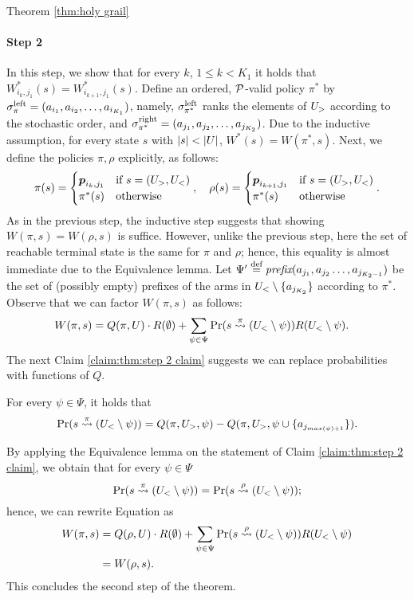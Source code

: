 \begin{proofof}{Theorem \ref{thm:holy grail}}
\paragraph{Step 2}  In this step, we show that for every $k$, $1\leq k < K_1$ it holds that $W^*_{{i_k},{j_1}}(s) = W^*_{{i_{k+1}},{j_1}}(s)$. Define an ordered, $\mathcal{P}$-valid policy $\pi^*$ by $\sigma^{\textnormal{left}}_\pi = (a_{i_1},a_{i_2},\dots,a_{i_{K_1}})$,  namely, $\sigma^{\textnormal{left}}_{\pi^*}$ ranks the elements of $U_>$ according to the stochastic order, and $\sigma^{\textnormal{right}}_{\pi^*}=(a_{j_1},a_{j_2},\dots,a_{j_{K_2}})$. Due to the inductive assumption, for every state $s$ with $\left| s \right|<\left| U \right|$, $W^*(s) = W(\pi^*,s)$. Next, we define the policies $\pi,\rho$ explicitly, as follows:
\[
\pi(s) = 
\begin{cases}
\boldsymbol{ p }_{{i_k},{j_1}} & \textnormal{if $s=(U_>,U_<)$} \\
\pi^*(s)& \textnormal{otherwise} 
\end{cases},\quad 
\rho(s) = 
\begin{cases}
\boldsymbol{ p }_{{i_{k+1}},{j_{1}}} & \textnormal{if $s=(U_>,U_<)$} \\
\pi^*(s)& \textnormal{otherwise}
\end{cases}.
\]
As in the previous step, the inductive step suggests that showing $W(\pi,s)=W(\rho,s)$ is suffice. However, unlike the previous step, here the set of reachable terminal state is the same for $\pi$ and $\rho$; hence, this equality is almost immediate due to the Equivalence lemma. Let $\Psi'\stackrel{\text{def}}{=} \textit{prefix}(a_{j_1},a_{j_2}\dots, a_{j_{K_2-1}})$ be the set of (possibly empty) prefixes of the arms in $U_< \setminus \{a_{j_{K_2}}\}$ according to $\pi^*$. Observe that we can factor $W(\pi,s)$ as follows:
\begin{align}\label{eq:w for pi with prob}
W(\pi,s) &= Q(\pi,U)\cdot R(\emptyset)+ \sum_{\psi \in \Psi}\Pr(s\stackrel{\pi}{\rightsquigarrow}(U_< \setminus \psi))R(U_< \setminus \psi).
\end{align}
The next Claim \ref{claim:thm:step 2 claim} suggests we can replace probabilities with functions of $Q$.
\begin{claim}\label{claim:thm:step 2 claim}
For every $\psi \in \Psi$, it holds that 
\[
\Pr(s\stackrel{\pi}{\rightsquigarrow}(U_< \setminus \psi))=Q(\pi,U_>, \psi)-Q(\pi,U_>,\psi \cup\{a_{j_{max(\psi)+1}} \}).
\]
\end{claim}
By applying the Equivalence lemma on the statement of  Claim \ref{claim:thm:step 2 claim}, we obtain that for every $\psi \in \Psi$
\[
\Pr(s\stackrel{\pi}{\rightsquigarrow}(U_< \setminus \psi))=\Pr(s\stackrel{\rho}{\rightsquigarrow}(U_< \setminus \psi));
\]
hence, we can rewrite Equation  as 
\begin{align*}
W(\pi,s) &= Q(\rho,U)\cdot R(\emptyset)+ \sum_{\psi \in \Psi}\Pr(s\stackrel{\rho}{\rightsquigarrow}(U_< \setminus \psi))R(U_< \setminus \psi)\\
&=W(\rho,s).
\end{align*}
This concludes the second step of the theorem.

\end{proofof}
